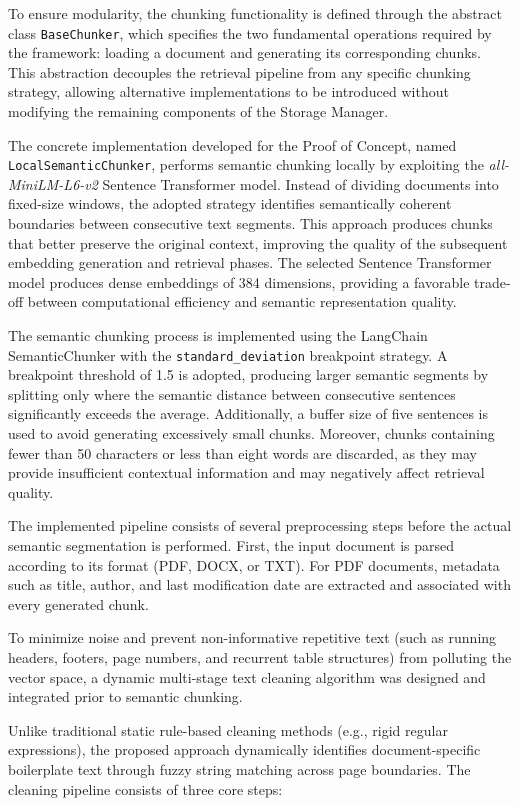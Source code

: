To ensure modularity, the chunking functionality is defined through the abstract class \texttt{BaseChunker}, which specifies the two fundamental operations required by the framework: loading a document and generating its corresponding chunks. This abstraction decouples the retrieval pipeline from any specific chunking strategy, allowing alternative implementations to be introduced without modifying the remaining components of the Storage Manager.

The concrete implementation developed for the Proof of Concept, named \texttt{LocalSemanticChunker}, performs semantic chunking locally by exploiting the \textit{all-MiniLM-L6-v2} Sentence Transformer model. Instead of dividing documents into fixed-size windows, the adopted strategy identifies semantically coherent boundaries between consecutive text segments. This approach produces chunks that better preserve the original context, improving the quality of the subsequent embedding generation and retrieval phases.
The selected Sentence Transformer model produces dense embeddings of 384 dimensions, providing a favorable trade-off between computational efficiency and semantic representation quality. 

The semantic chunking process is implemented using the LangChain SemanticChunker with the \texttt{standard\_deviation} breakpoint strategy. A breakpoint threshold of 1.5 is adopted, producing larger semantic segments by splitting only where the semantic distance between consecutive sentences significantly exceeds the average. Additionally, a buffer size of five sentences is used to avoid generating excessively small chunks. Moreover, chunks containing fewer than 50 characters or less than eight words are discarded, as they may provide insufficient contextual information and may negatively affect retrieval quality.

The implemented pipeline consists of several preprocessing steps before the actual semantic segmentation is performed. First, the input document is parsed according to its format (PDF, DOCX, or TXT). For PDF documents, metadata such as title, author, and last modification date are extracted and associated with every generated chunk.


To minimize noise and prevent non-informative repetitive text (such as running headers, footers, page numbers, and recurrent table structures) from polluting the vector space, a dynamic multi-stage text cleaning algorithm was designed and integrated prior to semantic chunking.

Unlike traditional static rule-based cleaning methods (e.g., rigid regular expressions), the proposed approach dynamically identifies document-specific boilerplate text through fuzzy string matching across page boundaries. The cleaning pipeline consists of three core steps:

